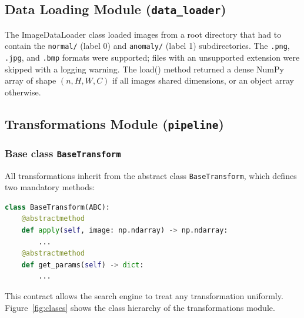 \documentclass[conference]{IEEEtran}
\begin{document}
\subsection{Data Loading Module (\texttt{data\_loader})}

The ImageDataLoader class loaded images from a root directory that had to
contain the \texttt{normal/} (label 0) and \texttt{anomaly/} (label 1)
subdirectories. The \texttt{.png}, \texttt{.jpg}, and \texttt{.bmp} formats
were supported; files with an unsupported extension were skipped with a
logging warning. The load() method returned a dense NumPy array of shape
$(n, H, W, C)$ if all images shared dimensions, or an object array otherwise.

\subsection{Transformations Module (\texttt{pipeline})}

\subsubsection{Base class \texttt{BaseTransform}}

All transformations inherit from the abstract class \texttt{BaseTransform},
which defines two mandatory methods:

\begin{lstlisting}[language=Python]
class BaseTransform(ABC):
    @abstractmethod
    def apply(self, image: np.ndarray) -> np.ndarray:
        ...
    @abstractmethod
    def get_params(self) -> dict:
        ...
\end{lstlisting}

This contract allows the search engine to treat any transformation uniformly.
Figure~\ref{fig:clases} shows the class hierarchy of the transformations
module.
\end{document}
